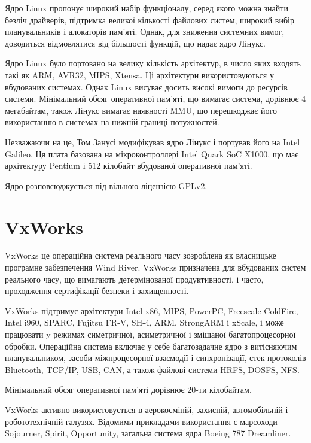 \documentclass[oneside,14pt,a4paper,final]{myextreport}
\begin{document}
Ядро Linux\cite{linux} пропонує широкий набір функціоналу, серед якого можна знайти безліч драйверів, підтримка великої кількості файлових систем, широкий вибір планувальників і алокаторів пам'яті. Однак, для зниження системних вимог, доводиться відмовлятися від більшості функцій, що надає ядро Лінукс.

Ядро Linux було портовано на велику кількість архітектур, в число яких входять такі як ARM, AVR32, MIPS, Xtensa. Ці архітектури використовуються у вбудованих системах. Однак Linux висуває досить високі вимоги до ресурсів системи. Мінімальний обсяг оперативної пам'яті, що вимагає система, дорівнює 4 мегабайтам, також Лінукс вимагає наявності \ac{MMU}, що перешкоджає його використанню в системах на нижній границі потужностей.

Незважаючи на це, Том Занусі модифікував ядро Лінукс і портував його на Intel Galileo\cite{linux-galileo}. Ця плата базована на мікроконтроллері Intel Quark SoC X1000, що має архітектуру Pentium і 512 кілобайт вбудованої оперативної пам'яті\cite{intel-galileo}.

Ядро розповсюджується під вільною ліцензією GPLv2.

\section{VxWorks}

VxWorks\cite{vxworks} це операційна система реального часу зозроблена як власницьке програмне забезпечення Wind River. VxWorks призначена для вбудованих систем реального часу, що вимагають детермінованої продуктивності, і часто, проходження сертифікації безпеки і захищенності.

VxWorks підтримує архітектури Intel x86, MIPS, PowerPC, Freescale ColdFire, Intel i960, SPARC, Fujitsu FR-V, SH-4, ARM, StrongARM і xScale, і може працювати y режимах симетричної, асиметричної і змішаної багатопроцесорної обробки. Операційна система включає у себе багатозадачне ядро з витісняючим планувальником, засоби міжпроцесорної взаємодії і синхронізації, стек протоколів Bluetooth, \acs{TCP/IP}, \acs{USB}, \acs{CAN}, а також файлові системи \ac{HRFS}, \acs{DOSFS}, \ac{NFS}.

Мінімальний обсяг оперативної пам'яті дорівнює 20-ти кілобайтам.

VxWorks активно використовується в аерокосміній, захисній, автомобільній і робототехнічній галузях. Відомими прикладами використання є марсоходи Sojourner, Spirit, Opportunity\cite{vxworks:rovers}, загальна система ядра Boeing 787 Dreamliner\cite{vxworks:boeing}.
\end{document}
